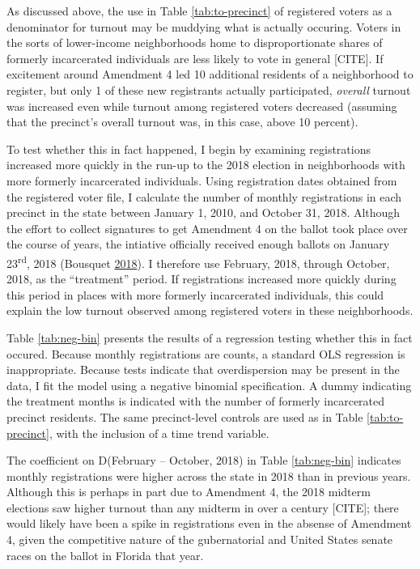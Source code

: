 \documentclass[
  12pt,
]{article}
\begin{document}
As discussed above, the use in Table \ref{tab:to-precinct} of registered voters as a denominator for turnout may be muddying what is actually occuring. Voters in the sorts of lower-income neighborhoods home to disproportionate shares of formerly incarcerated individuals are less likely to vote in general {[}CITE{]}. If excitement around Amendment 4 led 10 additional residents of a neighborhood to register, but only 1 of these new registrants actually participated, \emph{overall} turnout was increased even while turnout among registered voters decreased (assuming that the precinct's overall turnout was, in this case, above 10 percent).

To test whether this in fact happened, I begin by examining registrations increased more quickly in the run-up to the 2018 election in neighborhoods with more formerly incarcerated individuals. Using registration dates obtained from the registered voter file, I calculate the number of monthly registrations in each precinct in the state between January 1, 2010, and October 31, 2018. Although the effort to collect signatures to get Amendment 4 on the ballot took place over the course of years, the intiative officially received enough ballots on January 23\textsuperscript{rd}, 2018 (Bousquet \protect\hyperlink{ref-Bousquet2018}{2018}). I therefore use February, 2018, through October, 2018, as the ``treatment'' period. If registrations increased more quickly during this period in places with more formerly incarcerated individuals, this could explain the low turnout observed among registered voters in these neighborhoods.

Table \ref{tab:neg-bin} presents the results of a regression testing whether this in fact occured. Because monthly registrations are counts, a standard OLS regression is inappropriate. Because tests indicate that overdispersion may be present in the data, I fit the model using a negative binomial specification. A dummy indicating the treatment months is indicated with the number of formerly incarcerated precinct residents. The same precinct-level controls are used as in Table \ref{tab:to-precinct}, with the inclusion of a time trend variable.

\begin{singlespace}


\end{singlespace}

The coefficient on D(February -- October, 2018) in Table \ref{tab:neg-bin} indicates monthly registrations were higher across the state in 2018 than in previous years. Although this is perhaps in part due to Amendment 4, the 2018 midterm elections saw higher turnout than any midterm in over a century {[}CITE{]}; there would likely have been a spike in registrations even in the absense of Amendment 4, given the competitive nature of the gubernatorial and United States senate races on the ballot in Florida that year.
\end{document}
